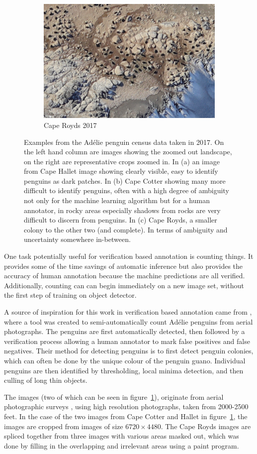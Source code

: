 \begin{figure}[pht!]
\begin{subfigure}[t]{1.0\linewidth}
  \hfill
  \includegraphics[width=0.475\linewidth]{figures/annotation/penguin/royds.jpg}
  \caption{Cape Royds 2017}
\end{subfigure}

\caption{Examples from the Ad\'elie penguin census data taken in 2017. On the left hand column are images showing the zoomed out landscape, on the right are representative crops zoomed in.  In (a) an image from Cape Hallet image showing clearly visible, easy to identify penguins as dark patches. In (b) Cape Cotter showing many more difficult to identify penguins, often with a high degree of ambiguity not only for the machine learning algorithm but for a human annotator, in rocky areas especially shadows from rocks are very difficult to discern from penguins. In (c) Cape Royds, a smaller colony to the other two (and complete). In terms of ambiguity and uncertainty somewhere in-between. }
\label {fig:penguin_examples}
\end{figure}


One task potentially useful for verification based annotation is counting things. It provides some of the time savings of automatic inference but also provides the accuracy of human annotation because the machine predictions are all verified. Additionally, counting can can begin immediately on a new image set, without the first step of training on object detector.

A source of inspiration for this work in verification based annotation came from \cite{McNeill2011}, where a tool was created to semi-automatically count Ad\'elie penguins from aerial photographs. The penguins are first automatically detected, then followed by a verification process allowing a human annotator to mark false positives and false negatives. Their method for detecting penguins is to first detect penguin colonies, which can often be done by the unique colour of the penguin guano. Individual penguins are then identified by thresholding, local minima detection, and then culling of long thin objects. 

The images (two of which can be seen in figure~\ref{fig:penguin_examples}), originate from aerial photographic surveys \cite{Lyver2014}, using high resolution photographs, taken from 2000-2500 feet. In the case of the two images from Cape Cotter and Hallet in figure~\ref{fig:penguin_examples}, the images are cropped from images of size $ 6720\times4480 $. The Cape Royds images are spliced together from three images with various areas masked out, which was done by filling in the overlapping and irrelevant areas using a paint program.

